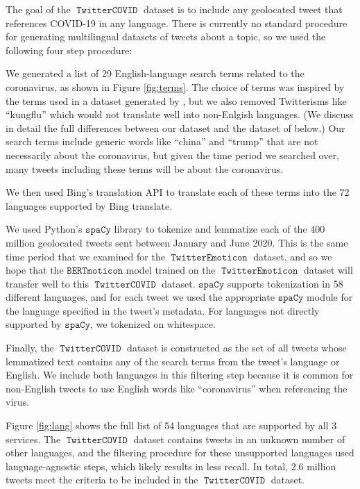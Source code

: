 \documentclass[11pt]{article}
\newcommand{\bertmoji}{\texttt{BERTmoticon}}
\newcommand{\spacy}{\texttt{spaCy}}
\DeclareMathOperator{\emoticon}{\texttt{TwitterEmoticon}}
\DeclareMathOperator{\corona}{\texttt{TwitterCOVID}}
\begin{document}
The goal of the $\corona$ dataset is to include any geolocated tweet that references COVID-19 in any language.
There is currently no standard procedure for generating multilingual datasets of tweets about a topic,
so we used the following four step procedure:
\begin{enumerate*}[label=(\arabic*)]
\item
    We generated a list of 29 English-language search terms related to the coronavirus,
    as shown in Figure \ref{fig:terms}.
    The choice of terms was inspired by the terms used in a dataset generated by \citet{chen2020tracking},
    but we also removed Twitterisms like ``kungflu'' which would not translate well into non-Enlgish languages.
        (We discuss in detail the full differences between our dataset and the dataset of \citet{chen2020tracking} below.)
    Our search terms include generic words like ``china'' and ``trump'' that are not necessarily about the coronavirus,
    but given the time period we searched over,
    many tweets including these terms will be about the coronavirus.
\item
    We then used Bing's translation API to translate each of these terms into the 72 languages supported by Bing translate.
\item
We used Python's $\spacy$ library \citep{spacy2} to tokenize and lemmatize each of the 400 million geolocated tweets sent between January and June 2020.
This is the same time period that we examined for the $\emoticon$ dataset,
and so we hope that the $\bertmoji$ model trained on the $\emoticon$ dataset will transfer well to this $\corona$ dataset.
$\spacy$ supports tokenization in 58 different languages,
and for each tweet we used the appropriate $\spacy$ module for the language specified in the tweet's metadata.
    For languages not directly supported by $\spacy$,
    we tokenized on whitespace.
\item
Finally, the $\corona$ dataset is constructed as the set of all tweets whose lemmatized text contains any of the search terms from the tweet's language or English.
We include both languages in this filtering step because it is common for non-English tweets to use English words like ``coronavirus'' when referencing the virus.
\end{enumerate*}
Figure \ref{fig:lang} shows the full list of 54 languages that are supported by all 3 services.
The $\corona$ dataset contains tweets in an unknown number of other languages,
and the filtering procedure for these unsupported languages used language-agnostic steps,
which likely results in less recall.
In total, 2.6 million tweets meet the criteria to be included in the $\corona$ dataset.
\end{document}
